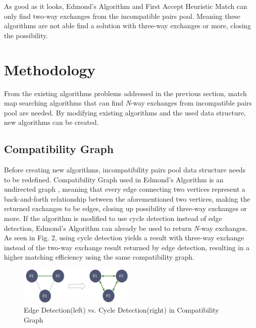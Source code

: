 \documentclass[conference]{IEEEtran}
\begin{document}
As good as it looks, Edmond's Algorithm and First Accept Heuristic Match can only find two-way exchanges from the
incompatible pairs pool. Meaning these algorithms are not able find a solution with three-way exchanges or more,
closing the possibility.

\section{Methodology}
From the existing algorithms problems addressed in the previous section, match map searching algorithms that can find
\textit{N}-way exchanges from incompatible pairs pool are needed. By modifying existing algorithms and the used data
structure, new algorithms can be created.

\subsection{Compatibility Graph}
Before creating new algorithms, incompatibility pairs pool data structure needs to be redefined. Compatibility Graph
used in Edmond's Algorithm is an undirected graph \cite{raja}, meaning that every edge connecting two vertices represent a back-and-forth
relationship between the aforementioned two vertices, making the returned exchanges to be edges, closing up possibility
of three-way exchanges or more. If the algorithm is modified to use cycle detection instead of edge detection, Edmond's
Algorithm can already be used to return \textit{N}-way exchanges.
As seen in Fig. 2, using cycle detection yields a result with three-way exchange instead of the two-way exchange result
returned by edge detection, resulting in a higher matching efficiency using the same compatibility graph. 

\begin{figure}
\includegraphics[width=0.5\textwidth]{images/edge-vs-cycle-detection.jpg}
\caption{Edge Detection(left) vs. Cycle Detection(right) in Compatibility Graph}
\end{figure}
\end{document}
